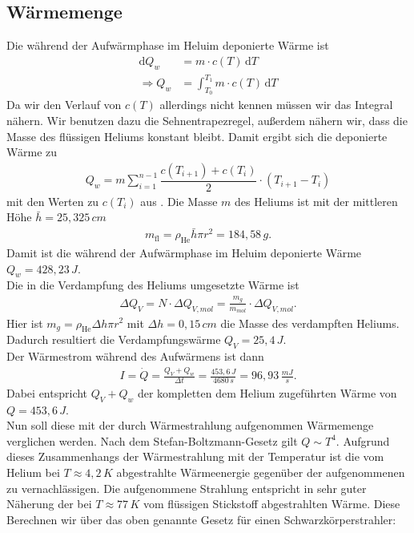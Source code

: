 \documentclass[twoside,colorback,accentcolor=tud4c,11pt]{tudreport}
\begin{document}
\subsection{Wärmemenge}
Die während der Aufwärmphase im Heluim deponierte Wärme ist 
\begin{align}
\mathrm{d}Q_w&=m\cdot c(T)\,\mathrm{d}T\\
\Rightarrow Q_w&=\int_{T_0}^{T_1}m\cdot c(T)\,\mathrm{d}T
\end{align}
Da wir den Verlauf von $ c(T) $ allerdings nicht kennen müssen wir das Integral nähern. Wir benutzen dazu die Sehnentrapezregel, außerdem nähern wir, dass die Masse des flüssigen Heliums konstant bleibt. Damit ergibt sich die deponierte Wärme zu
\begin{align}
Q_w=m\sum_{i=1}^{n-1}\dfrac{c(T_{i+1})+c(T_{i})}{2}\cdot(T_{i+1}-T_i)
\end{align}
mit den Werten zu $ c(T_{i}) $ aus \cite{Sciver}. Die Masse $m$ des Heliums ist mit der mittleren Höhe $\bar{h}=25,325\,\si{cm}$
\begin{align}
m_{\mathrm{fl}}=\rho_{\mathrm{He}}\bar{h}\pi r^2=184,58\,\si{g}.
\end{align}
Damit ist die während der Aufwärmphase im Heluim deponierte Wärme $ Q_w=428,23\,\si{J} $.\\
Die in die Verdampfung des Heliums umgesetzte Wärme ist 
\begin{align}
\Delta Q_{V}=N\cdot\Delta Q_{V,\si{mol}}=\frac{m_g}{m_{\si{mol}}}\cdot\Delta Q_{V,\si{mol}}.
\end{align}
Hier ist $ m_g=\rho_{\mathrm{He}}\Delta h\pi r^2$ mit $ \Delta h=0,15\,\si{cm} $ die Masse des verdampften Heliums. Dadurch resultiert die Verdampfungswärme $ Q_{V}=25,4\,\si{J} $. \\
Der Wärmestrom während des Aufwärmens ist dann
\begin{align}
I=\dot{Q}=\frac{Q_V+Q_w}{\Delta t}=\frac{453,6\,\si{J}}{4680\,\si{s}}=96,93\,\si{\frac{mJ}{s}}.
\end{align}
Dabei entspricht $Q_V+Q_w$ der kompletten dem Helium zugeführten Wärme von $Q=453,6\,\si{J}$.\\
Nun soll diese mit der durch Wärmestrahlung aufgenommen Wärmemenge verglichen werden. Nach dem Stefan-Boltzmann-Gesetz gilt $Q\sim T^4$. Aufgrund dieses Zusammenhangs der Wärmestrahlung mit der Temperatur ist die vom Helium bei $T\approx 4,2\,\si{K}$ abgestrahlte Wärmeenergie gegenüber der aufgenommenen zu vernachlässigen. Die aufgenommene Strahlung entspricht in sehr guter Näherung der bei $T\approx 77\,\si{K}$ vom flüssigen Stickstoff abgestrahlten Wärme. Diese Berechnen wir über das oben genannte Gesetz für einen Schwarzkörperstrahler:
\end{document}
